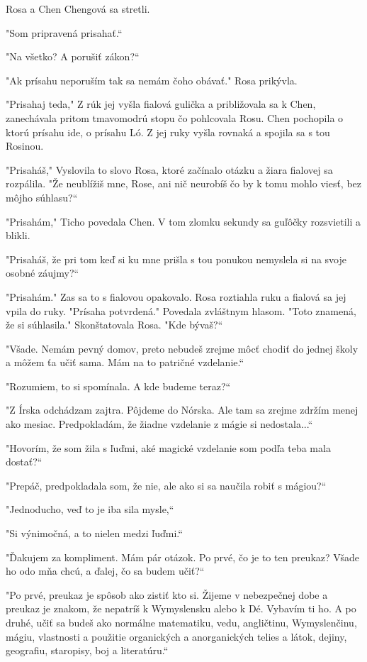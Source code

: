 \documentclass{book}
\begin{document}
Rosa a Chen Chengová sa stretli.

"$ $Som pripravená prisahať.“

"$ $Na všetko? A porušiť zákon?“

"$ $Ak prísahu neporuším tak sa nemám čoho obávať."$ $ Rosa prikývla.

"$ $Prisahaj teda,"$ $ Z rúk jej vyšla fialová gulička a približovala sa k Chen, zanechávala pritom tmavomodrú stopu čo pohlcovala Rosu. Chen pochopila o ktorú prísahu ide, o prísahu Ló. Z jej ruky vyšla rovnaká a spojila sa s tou Rosinou.

"$ $Prisaháš,"$ $ Vyslovila to slovo Rosa, ktoré začínalo otázku a žiara fialovej sa rozpálila. "$ $Že neublížiš mne, Rose, ani nič neurobíš čo by k tomu mohlo viesť, bez môjho súhlasu?“

"$ $Prisahám,"$ $ Ticho povedala Chen. V tom zlomku sekundy sa guľôčky rozsvietili a blikli.

"$ $Prisaháš, že pri tom keď si ku mne prišla s tou ponukou nemyslela si na svoje osobné záujmy?“

"$ $Prisahám."$ $ Zas sa to s fialovou opakovalo. Rosa roztiahla ruku a fialová sa jej vpila do ruky. "$ $Prísaha potvrdená."$ $ Povedala zvláštnym hlasom. "$ $Toto znamená, že si súhlasila."$ $ Skonštatovala Rosa. "$ $Kde bývaš?“

"$ $Všade. Nemám pevný domov, preto nebudeš zrejme môcť chodiť do jednej školy a môžem ťa učiť sama. Mám na to patričné vzdelanie.“

"$ $Rozumiem, to si spomínala. A kde budeme teraz?“

"$ $Z Írska odchádzam zajtra. Pôjdeme do Nórska. Ale tam sa zrejme zdržím menej ako mesiac. Predpokladám, že žiadne vzdelanie z mágie si nedostala...“

"$ $Hovorím, že som žila s ľuďmi, aké magické vzdelanie som podľa teba mala dostať?“

"$ $Prepáč, predpokladala som, že nie, ale ako si sa naučila robiť s mágiou?“

"$ $Jednoducho, veď to je iba sila mysle,“

"$ $Si výnimočná, a to nielen medzi ľuďmi.“

"$ $Ďakujem za kompliment. Mám pár otázok. Po prvé, čo je to ten preukaz? Všade ho odo mňa chcú, a ďalej, čo sa budem učiť?“

"$ $Po prvé, preukaz je spôsob ako zistiť kto si. Žijeme v nebezpečnej dobe a preukaz je znakom, že nepatríš k Wymyslensku alebo k Dé. Vybavím ti ho. A po druhé, učiť sa budeš ako normálne matematiku, vedu, angličtinu, Wymyslenčinu, mágiu, vlastnosti a použitie organických a anorganických telies a látok, dejiny, geografiu, staropisy, boj a literatúru.“
\end{document}
